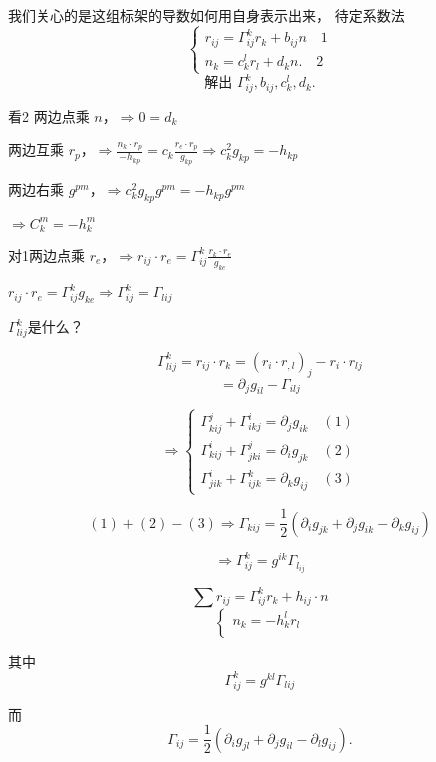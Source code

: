 \documentclass[lang=cn,10pt,thmcnt=section]{elegantbook}
\begin{document}
我们关心的是这组标架的导数如何用自身表示出来，
待定系数法
\[
\begin{cases}
r_{ij} = \Gamma_{ij}^k r_k + b_{ij} n \quad 1\\
n_k = c_k^l r_l + d_k n.\quad 2
\end{cases}
\]
\[
\text{解出 } \Gamma_{ij}^k, b_{ij}, c_k^l, d_k.
\]

看2 两边点乘 $n$，$\Rightarrow 0 = d_k$

两边互乘 $r_p$，$\Rightarrow \frac{n_k \cdot r_p}{-h_{kp}} = c_k \frac{r_e \cdot r_p}{g_{kp}} \Rightarrow c_k^2 g_{kp} = -h_{kp}$

两边右乘 $g^{pm}$，$\Rightarrow c_k^2 g_{kp} g^{pm} = -h_{kp} g^{pm}$

$\Rightarrow C_k^m = -h_k^m$

对1两边点乘 $r_e$，$\Rightarrow r_{ij} \cdot r_e = \Gamma_{ij}^k \frac{r_k \cdot r_e}{g_{ke}}$

$r_{ij} \cdot r_e = \Gamma_{ij}^k g_{ke} \Rightarrow \Gamma_{ij}^k = \Gamma_{lij}$

$\Gamma^{k}_{lij} $是什么？

\[
    \Gamma^{k}_{lij}  = r_{ij} \cdot r_k = (r_i \cdot r_{,l})_j - r_i \cdot r_{lj}
\]
\[
= \partial_j g_{il} - \Gamma_{ilj}
\]

\[
\Rightarrow
\begin{cases}
\Gamma_{kij}^j + \Gamma_{ikj}^i = \partial_j g_{ik} \quad (1) \\
\Gamma_{kij}^i + \Gamma_{jki}^j = \partial_i g_{jk} \quad (2) \\
\Gamma_{jik}^i + \Gamma_{ijk}^k = \partial_k g_{ij} \quad (3)
\end{cases}
\]

\[
(1) + (2) - (3) \Rightarrow \Gamma_{kij}  = \frac{1}{2} (\partial_i g_{jk} + \partial_j g_{ik} - \partial_k g_{ij})
\]

\[
\Rightarrow \Gamma^k_{ij} = g^{ik} \Gamma_{l_{ij}}
\]

\begin{proposition}
    \[
\sum r_{ij} = \Gamma_{ij}^k r_k + h_{ij} \cdot n
\]
\[
\left\{
\begin{array}{l}
n_k = - h_k^l r_l \\
\end{array}
\right.
\]

其中
\[
\Gamma_{ij}^k = g^{kl} \Gamma_{lij}
\]

而
\[
\Gamma_{ij} = \frac{1}{2} (\partial_i g_{jl} + \partial_j g_{il} - \partial_l g_{ij}).
\]

\end{proposition}
\end{document}
